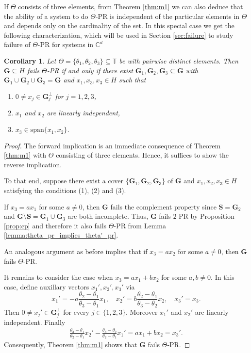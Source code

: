 \documentclass[reqno,a4paper,11pt]{amsart}
\numberwithin{equation}{section}
\newtheorem{corollary}[definition]{Corollary}
\def\T{{\mathbb T}}
\def\C{{\mathbb C}}
\newcommand{\lspan}{{\mathrm{span}}}
\newcommand\1{\mathds{1}}
\begin{document}
If $\Theta$ consists of three elements, from Theorem \ref{thm:m1} we can also deduce that the ability of a system to do $\Theta$-PR is independent of the particular elements in $\Theta$ and depends only on the cardinality of the set. In this special case we get the following characterization, which will be used in Section \ref{sec:failure} to study failure of $\Theta$-PR for systems in $\C^d$

\begin{corollary}\label{cor:3_pr_characterization}
    Let $\Theta = \{\theta_1,\theta_2,\theta_3\}\subseteq \T$ be with pairwise distinct elements. Then $\mathbf{G} \subseteq H$ fails $\Theta$-PR if and only if there exist $\mathbf{G}_1, \mathbf{G}_2, \mathbf{G}_3\subseteq \mathbf{G}$ with $\mathbf{G}_1 \cup \mathbf{G}_2 \cup \mathbf{G}_3 = \mathbf{G}$ and $x_1,x_3,x_3 \in H$ such that 
    \begin{enumerate}
        \item $0\neq x_j \in \mathbf{G}_j^\perp$ for $j=1,2,3$,
        \item $x_1$ and $x_2$ are linearly independent,
        \item $x_3 \in \lspan\{x_1,x_2\}$.
    \end{enumerate}
\end{corollary}
\begin{proof}
    The forward implication is an immediate consequence of Theorem \ref{thm:m1} with $\Theta$ consisting of three elements. Hence, it suffices to show the reverse implication.

    To that end, suppose there exist a cover $\{ \mathbf{G}_1,\mathbf{G}_2,\mathbf{G}_3 \}$ of $\mathbf{G}$ and $x_1,x_2,x_3 \in H$ satisfying the conditions (1), (2) and (3). 

    If $x_3 = ax_1$ for some $a \neq 0$, then $\mathbf{G}$ fails the complement property since $\mathbf{S}=\mathbf{G}_2$ and $\mathbf{G} \setminus \mathbf{S}  = \mathbf{G}_1 \cup \mathbf{G}_3$ are both incomplete. Thus, $\mathbf{G}$ fails $2$-PR by Proposition \ref{prop:cp} and therefore it also fails $\Theta$-PR from Lemma \ref{lemma:theta_pr_implies_theta'_pr}.

    An analogous argument as before implies that if $x_3=ax_2$ for some $a \neq 0$, then $\mathbf{G}$ fails $\Theta$-PR.
    
    It remains to consider the case when $x_3 =ax_1+bx_2$ for some $a,b\neq 0$. In this case, define auxillary vectors $x_1',x_2',x_3'$ via
$$
x_1' = -a\frac{\theta_2-\theta_1}{\theta_3-\theta_1}x_1, \quad x_2'=b\frac{\theta_2-\theta_1}{\theta_3-\theta_2}x_2, \quad  x_3'=x_3.
$$
Then $0 \neq x_j' \in \mathbf{G}_j^\perp$ for every $j \in \{ 1,2,3 \}$. Moreover $x_1'$ and $x_2'$ are linearly independent. Finally
    \begin{align*}
        \frac{\theta_3-\theta_1}{\theta_2-\theta_1}x_2' - \frac{\theta_3-\theta_2}{\theta_2-\theta_1}x_1' = ax_1 + bx_2 = x_3'.
    \end{align*}
    Consequently, Theorem \ref{thm:m1} shows that $\mathbf{G}$ fails $\Theta$-PR.
\end{proof}
\end{document}
